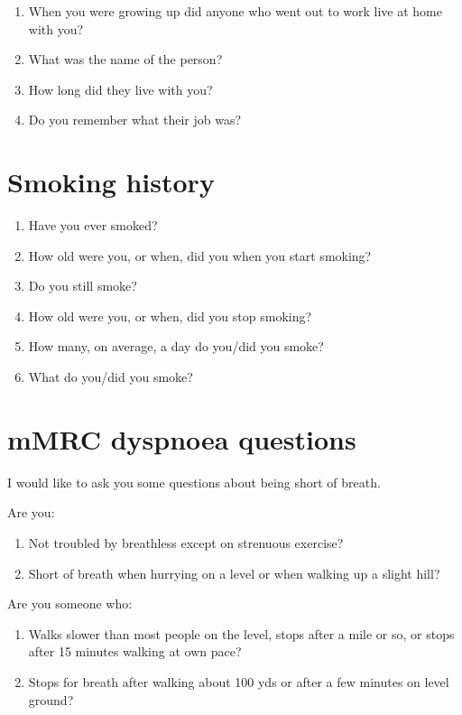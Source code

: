 \documentclass[a4paper,10pt]{article}
\begin{document}
\begin{enumerate}

\item When you were growing up did anyone who went out to work live at home with you?
\item What was the name of the person?
\item How long did they live with you?
\item Do you remember what their job was?
\end{enumerate}


\section{Smoking history}

\begin{enumerate}
\item Have you ever smoked?
\item How old were you, or when, did you when you start smoking?
\item Do you still smoke?
\item How old were you, or when, did you stop smoking?
\item How many, on average, a day do you/did you smoke?
\item What do you/did you smoke?
\end{enumerate}

\section{mMRC dyspnoea questions} 

I would like to ask you some questions about being short of breath.

Are you:

\begin{enumerate}
\item Not troubled by breathless except on strenuous exercise?
\item Short of breath when hurrying on a level or when walking up a slight hill?
\end{enumerate}

Are you someone who:

\begin{enumerate}[resume]
\item Walks slower than most people on the level, stops after a mile or so, or stops after 15 minutes walking at own pace?
\item Stops for breath after walking about 100 yds or after a few minutes on level ground?
\end{enumerate}
\end{document}
